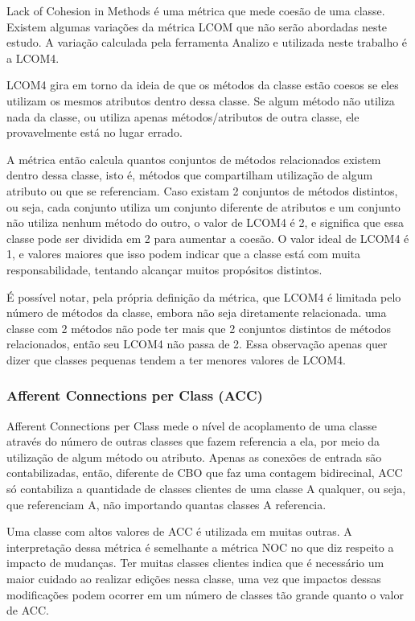 Lack of Cohesion in Methods é uma métrica que mede coesão de uma classe. Existem algumas variações da métrica LCOM que não serão abordadas neste estudo. A variação calculada pela ferramenta Analizo e utilizada neste trabalho é a LCOM4.

LCOM4 gira em torno da ideia de que os métodos da classe estão coesos se eles utilizam os mesmos atributos dentro dessa classe. Se algum método não utiliza nada da classe, ou utiliza apenas métodos/atributos de outra classe, ele provavelmente está no lugar errado. 

A métrica então calcula quantos conjuntos de métodos relacionados existem dentro dessa classe, isto é, métodos que compartilham utilização de algum atributo ou que se referenciam. Caso existam 2 conjuntos de métodos distintos, ou seja, cada conjunto utiliza um conjunto diferente de atributos e um conjunto não utiliza nenhum método do outro, o valor de LCOM4 é 2, e significa que essa classe pode ser dividida em 2 para aumentar a coesão. O valor ideal de LCOM4 é 1, e valores maiores que isso podem indicar que a classe está com muita responsabilidade, tentando alcançar muitos propósitos distintos.

É possível notar, pela própria definição da métrica, que LCOM4 é limitada pelo número de métodos da classe, embora não seja diretamente relacionada. uma classe com 2 métodos não pode ter mais que 2 conjuntos distintos de métodos relacionados, então seu LCOM4 não passa de 2. Essa observação apenas quer dizer que classes pequenas tendem a ter menores valores de LCOM4.

\subsubsection{Afferent Connections per Class (ACC)}

Afferent Connections per Class mede o nível de acoplamento de uma classe através do número de outras classes que fazem referencia a ela, por meio da utilização de algum método ou atributo. Apenas as conexões de entrada são contabilizadas, então, diferente de CBO que faz uma contagem bidirecinal, ACC só contabiliza a quantidade de classes clientes de uma classe A qualquer, ou seja, que referenciam A, não importando quantas classes A referencia.

Uma classe com altos valores de ACC é utilizada em muitas outras. A interpretação dessa métrica é semelhante a métrica NOC no que diz respeito a impacto de mudanças. Ter muitas classes clientes indica que é necessário um maior cuidado ao realizar edições nessa classe, uma vez que impactos dessas modificações podem ocorrer em um número de classes tão grande quanto o valor de ACC.

